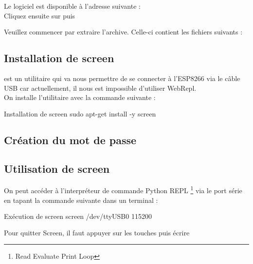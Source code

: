 Le logiciel est disponible à l'adresse suivante : \\



Cliquez ensuite sur  puis 


Veuillez commencer par extraire l'archive.
Celle-ci contient les fichiers suivants : 


\subsection{Installation de screen}

 est un utilitaire qui va nous permettre de se connecter à l'ESP8266 via le câble USB car actuellement, il nous est impossible d'utiliser WebRepl.\\
On installe l'utilitaire avec la commande suivante : 
\begin{Bash}{Installation de screen}
sudo apt-get install -y screen
\end{Bash}

\subsection{Création du mot de passe}

\subsection{Utilisation de screen}

On peut accéder à l’interpréteur de commande Python REPL \footnote{Read Evaluate Print Loop} via le port série en tapant la commande suivante dans un terminal :

\begin{Bash}{Exécution de screen}
screen /dev/ttyUSB0 115200
\end{Bash}





Pour quitter Screen, il faut appuyer sur les touches  puis écrire  \\

